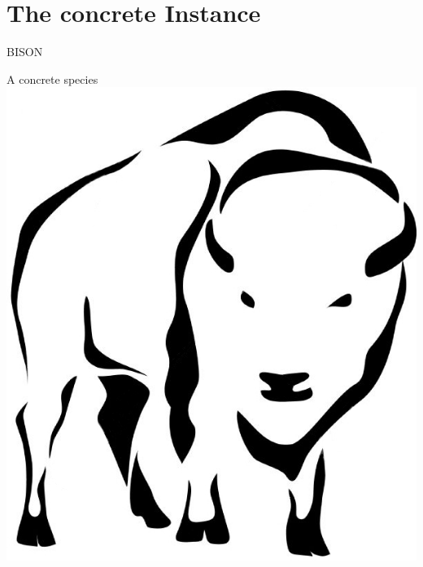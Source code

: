 \section{The concrete Instance}
\begin{frame}{BISON}
    \centering
    \begin{minipage}{0.35\textwidth}
    \centering
    \begin{block}{A concrete species}
        \centering
        \vspace{2pt}
        \includegraphics[height=0.7\textheight]{data/bison-logo}
    \end{block}
    \end{minipage}
\end{frame}

